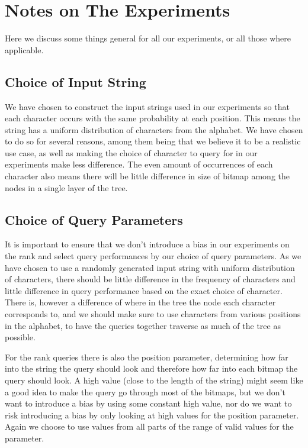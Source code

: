 \section{Notes on The Experiments}
Here we discuss some things general for all our experiments, or all those where applicable.

\subsection{Choice of Input String}
We have chosen to construct the input strings used in our experiments so that each character occurs with the same probability at each position.
This means the string has a uniform distribution of characters from the alphabet.
We have chosen to do so for several reasons, among them being that we believe it to be a realistic use case, as well as making the choice of character to query for in our experiments make less difference.
The even amount of occurrences of each character also means there will be little difference in size of bitmap among the nodes in a single layer of the tree.


\subsection{Choice of Query Parameters}
It is important to ensure that we don't introduce a bias in our experiments on the rank and select query performances by our choice of query parameters.
As we have chosen to use a randomly generated input string with uniform distribution of characters, there should be little difference in the frequency of characters and little difference in query performance based on the exact choice of character.
There is, however a difference of where in the tree the node each character corresponds to, and we should make sure to use characters from various positions in the alphabet, to have the queries together traverse as much of the tree as possible.

For the rank queries there is also the position parameter, determining how far into the string the query should look and therefore how far into each bitmap the query should look.
A high value (close to the length of the string) might seem like a good idea to make the query go through most of the bitmaps, but we don't want to introduce a bias by using some constant high value, nor do we want to risk introducing a bias by only looking at high values for the position parameter.
Again we choose to use values from all parts of the range of valid values for the parameter.

